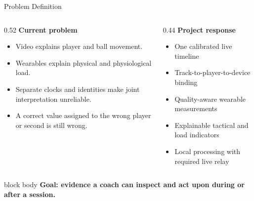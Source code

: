 \documentclass[aspectratio=169,10pt]{beamer}
\begin{document}
\begin{frame}{Problem Definition}
\begin{columns}[T,onlytextwidth]
\begin{column}{0.52\textwidth}
\textbf{Current problem}
\begin{itemize}
  \item Video explains player and ball movement.
  \item Wearables explain physical and physiological load.
  \item Separate clocks and identities make joint interpretation unreliable.
  \item A correct value assigned to the wrong player or second is still wrong.
\end{itemize}
\end{column}
\begin{column}{0.44\textwidth}
\textbf{Project response}
\begin{itemize}
  \item One calibrated live timeline
  \item Track-to-player-to-device binding
  \item Quality-aware wearable measurements
  \item Explainable tactical and load indicators
  \item Local processing with required live relay
\end{itemize}
\end{column}
\end{columns}
\vspace{0.25cm}
\begin{beamercolorbox}[rounded=false,sep=0.25cm]{block body}
\centering\bfseries Goal: evidence a coach can inspect and act upon during or after a session.
\end{beamercolorbox}
\end{frame}
\end{document}
